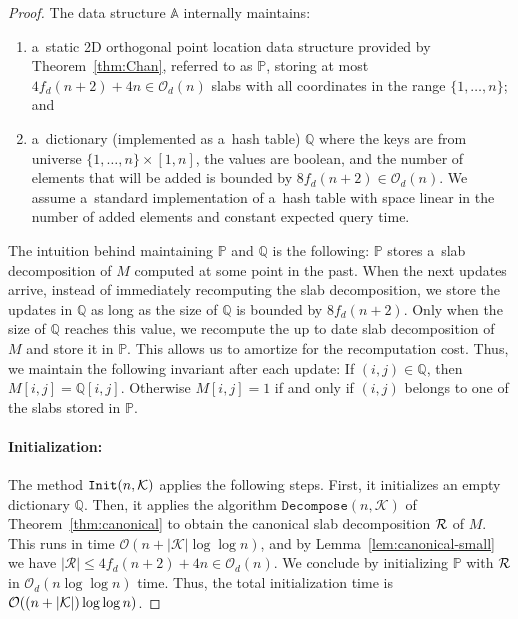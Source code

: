 \documentclass[runningheads]{llncs}
\newcommand{\Oh}{\mathcal{O}}
\renewcommand{\leq}{\leqslant}
\begin{document}
\begin{proof}
The data structure $\mathbb{A}$ internally maintains:
\begin{enumerate}
 \item a~static 2D orthogonal point location data structure provided by Theorem~\ref{thm:Chan}, referred to as $\mathbb{P}$, storing at most
 $4 f_d(n+2)+4n \in \Oh_d(n)$ slabs with all coordinates in the range
 $\{ 1, \ldots, n \}$; and
 \item a~dictionary (implemented as a~hash table) $\mathbb{Q}$ where
 the keys are
 from universe
 $\{1, \ldots, n \}\times [1,n]$, the values are
 boolean,
 and the number of elements that will be added is bounded by
 $8 f_d(n+2) \in \Oh_d(n)$. We assume a~standard implementation
 of a~hash
 table with space linear in the number of added elements
 and constant expected query time.
\end{enumerate}

The intuition behind maintaining $\mathbb{P}$ and $\mathbb{Q}$
is the following: $\mathbb{P}$ stores a~slab decomposition of $M$
computed at some point in the past. When the next updates arrive,
instead of immediately recomputing the slab decomposition, we
store the updates in $\mathbb{Q}$ as long as the size of
$\mathbb{Q}$ is bounded by $8 f_d(n+2)$. Only when the size
of $\mathbb{Q}$ reaches this value, we recompute the up to date
slab
decomposition of $M$ and store it in $\mathbb{P}$. This allows
us to amortize for the recomputation cost.
Thus, we maintain the following invariant after each update:
If $(i, j) \in \mathbb{Q}$, then $M[i, j] = \mathbb{Q}[i, j]$.
Otherwise $M[i, j]=1$ if and only if $(i, j)$ belongs to one of the
slabs stored in $\mathbb{P}$.

\paragraph*{Initialization:} The method $\mathtt{Init}(n, \cal K)$ applies the following steps.
First, it initializes an empty dictionary $\mathbb{Q}$. Then, it
applies the algorithm $\mathtt{Decompose}(n,\mathcal{K})$ of Theorem~\ref{thm:canonical} to obtain the canonical
slab decomposition $\cal R$ of $M$. This runs in time
$\Oh(n+|\mathcal{K}| \log \log n)$, and by
Lemma~\ref{lem:canonical-small} we have $|\mathcal{R}| \leq 4 f_d(n+2)+4n \in \Oh_d(n)$.
We conclude by initializing
$\mathbb{P}$ with $\cal R$ in $\Oh_d(n \log \log n)$ time.
Thus, the total initialization time is
$\Oh((n + |{\cal K}|) \log \log n)$.


\end{proof}
\end{document}
